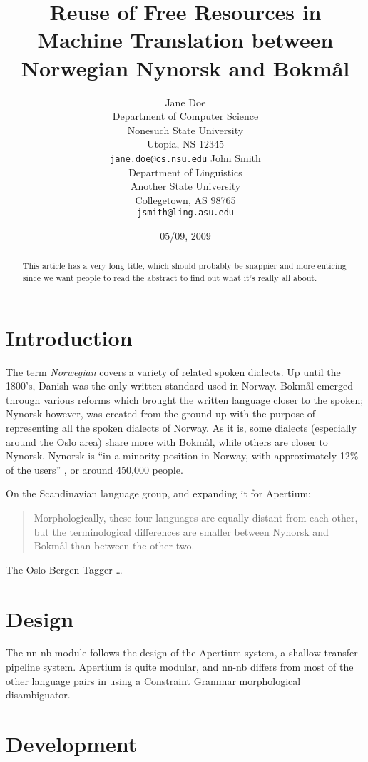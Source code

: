 \documentclass[11pt]{article}
\author{Jane Doe\\  Department of Computer Science \\  Nonesuch State University \\  Utopia, NS 12345 \\  {\tt jane.doe@cs.nsu.edu} \And  John Smith \\  Department of Linguistics \\  Another State University \\  Collegetown, AS 98765 \\    {\tt jsmith@ling.asu.edu}}
\title{Reuse of Free Resources in Machine Translation between Norwegian Nynorsk and Bokmål}
\date{05/09, 2009}
\begin{document}
\maketitle


\begin{abstract}

  This article has a very long title, which should probably be snappier and more enticing since we want people to read the abstract to find out what it's really all about.
\end{abstract}

\section{Introduction}
\label{sec-1}

The term \emph{Norwegian} covers a variety of related spoken dialects. Up
until the 1800's, Danish was the only written standard used in
Norway. Bokmål emerged through various reforms which brought the
written language closer to the spoken; Nynorsk however, was created
from the ground up with the purpose of representing all the spoken
dialects of Norway. As it is, some dialects (especially around the
Oslo area) share more with Bokmål, while others are closer to
Nynorsk. Nynorsk is ``in a minority position in Norway, with
approximately 12\% of the users'' \citep{everson2000sln}, or around
450,000 people.

On the Scandinavian language group, and expanding it for Apertium:
\begin{quote}
Morphologically, these four languages are equally distant from each
other, but the terminological differences are smaller between Nynorsk
and Bokmål than between the other two. \\
\citep{everson2000sln}
\end{quote}



The Oslo-Bergen Tagger \citep{hagen2000cbt} \ldots{}


\section{Design}
\label{sec-2}

The nn-nb module follows the design of the Apertium
system\citep{corbi05oss}, a shallow-transfer pipeline system. Apertium is
quite modular, and nn-nb differs from most of the other language pairs
in using a Constraint Grammar morphological disambiguator.
\section{Development}
\label{sec-3}
\end{document}
